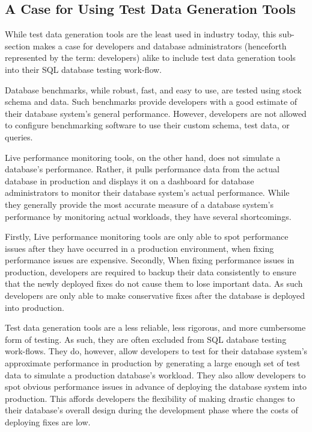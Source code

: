 \documentclass[12pt]{report}
\begin{document}
\begin{spacing}{1.9}
		
		
		
		\section{A Case for Using Test Data Generation Tools}
		While test data generation tools are the least used in industry today, this sub-section makes a case for developers and database administrators (henceforth represented by the term: developers) alike to include test data generation tools into their SQL database testing work-flow.
		
		Database benchmarks, while robust, fast, and easy to use, are tested using stock schema and data. Such benchmarks provide developers with a good estimate of their database system’s general performance. However, developers are not allowed to configure benchmarking software to use their custom schema, test data, or queries.
		
		Live performance monitoring tools, on the other hand, does not simulate a database’s performance. Rather, it pulls performance data from the actual database in production and displays it on a dashboard for database administrators to monitor their database system’s actual performance. While they generally provide the most accurate measure of a database system’s performance by monitoring actual workloads, they have several shortcomings.
		
		Firstly, Live performance monitoring tools are only able to spot performance issues after they have occurred in a production environment, when fixing performance issues are expensive. Secondly, When fixing performance issues in production, developers are required to backup their data consistently to ensure that the newly deployed fixes do not cause them to lose important data. As such developers are only able to make conservative fixes after the database is deployed into production.
		
		Test data generation tools are a less reliable, less rigorous, and more cumbersome form of testing. As such, they are often excluded from SQL database testing work-flows. They do, however, allow developers to test for their database system’s approximate performance in production by generating a large enough set of test data to simulate a production database’s workload. They also allow developers to spot obvious performance issues in advance of deploying the database system into production. This affords developers the flexibility of making drastic changes to their database’s overall design during the development phase where the costs of deploying fixes are low.
		

\end{spacing}
\end{document}
